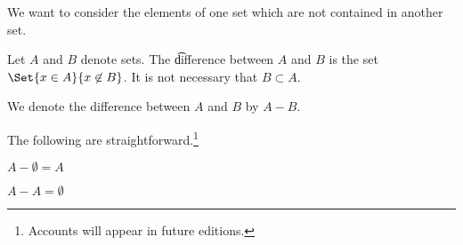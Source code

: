 

We want to consider the elements of one set which are not contained in another set.


Let $A$ and $B$ denote sets.
The \t{difference} between $A$ and $B$ is the set $\Set{x \in A}{x \not\in B}$.
It is not necessary that $B \subset A$.


We denote the difference between $A$ and $B$ by $A - B$.


The following are straightforward.\footnote{Accounts will appear in future editions.}

\begin{proposition}
  $A - \emptyset = A$
\end{proposition}

\begin{proposition}
  $A - A = \emptyset$
\end{proposition}



\blankpage
